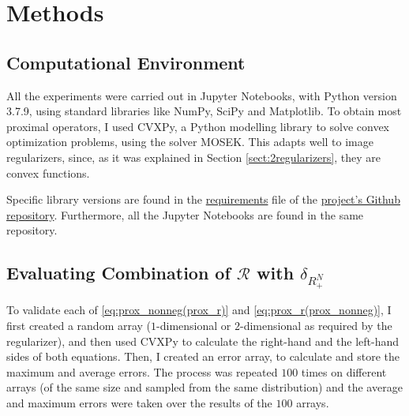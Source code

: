 \section{Methods} \label{sect:2_methods}

\subsection{Computational Environment} \label{sect:2environment}
All the experiments were carried out in Jupyter Notebooks, with Python version 3.7.9, using standard libraries like NumPy, SciPy and Matplotlib. To obtain most proximal operators, I used CVXPy, a Python modelling library to solve convex optimization problems, using the solver MOSEK. This adapts well to image regularizers, since, as it was explained in Section \ref{sect:2regularizers}, they are convex functions.  

Specific library versions are found in the \href{https://github.com/Alejandro-1996/ProximalOperatorsProject/requirements.txt}{requirements} file of the \href{https://github.com/Alejandro-1996/ProximalOperatorsProject}{project's Github repository}. Furthermore, all the Jupyter Notebooks are found in the same repository. 

\subsection {Evaluating Combination of $\mathcal{R}$ with $\delta_{R_+^N}$}  \label{sect:2evaluating}

To validate each of \eqref{eq:prox_nonneg(prox_r)} and \eqref{eq:prox_r(prox_nonneg)}, I first created a random array ($1$-dimensional or $2$-dimensional as required by the regularizer), and then used CVXPy to calculate the right-hand and the left-hand sides of both equations. Then, I created an error array, to calculate and store the maximum and average errors. The process was repeated $100$ times on different arrays (of the same size and sampled from the same distribution) and the average and maximum errors were taken over the results of the $100$ arrays.


